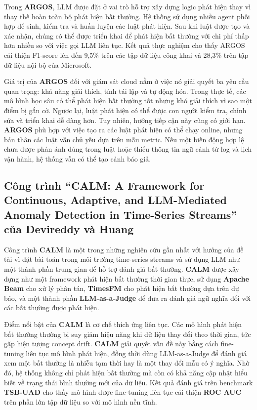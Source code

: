 Trong \textbf{ARGOS}, LLM được đặt ở vai trò hỗ trợ xây dựng logic phát hiện thay vì thay thế hoàn toàn bộ phát hiện bất thường. Hệ thống sử dụng nhiều agent phối hợp để sinh, kiểm tra và huấn luyện các luật phát hiện. Sau khi luật được tạo và xác nhận, chúng có thể được triển khai để phát hiện bất thường với chi phí thấp hơn nhiều so với việc gọi LLM liên tục. Kết quả thực nghiệm cho thấy ARGOS cải thiện F1-score lên đến 9,5\% trên các tập dữ liệu công khai và 28,3\% trên tập dữ liệu nội bộ của Microsoft.

Giá trị của \textbf{ARGOS} đối với giám sát cloud nằm ở việc nó giải quyết ba yêu cầu quan trọng: khả năng giải thích, tính tái lập và tự động hóa. Trong thực tế, các mô hình học sâu có thể phát hiện bất thường tốt nhưng khó giải thích vì sao một điểm bị gắn cờ. Ngược lại, luật phát hiện có thể được con người kiểm tra, chỉnh sửa và triển khai dễ dàng hơn. Tuy nhiên, hướng tiếp cận này cũng có giới hạn. \textbf{ARGOS} phù hợp với việc tạo ra các luật phát hiện có thể chạy online, nhưng bản thân các luật vẫn chủ yếu dựa trên mẫu metric. Nếu một biến động hợp lệ chưa được phản ánh đúng trong luật hoặc thiếu thông tin ngữ cảnh từ log và lịch vận hành, hệ thống vẫn có thể tạo cảnh báo giả.

\subsection*{Công trình “CALM: A Framework for Continuous, Adaptive, and LLM-Mediated Anomaly Detection in Time-Series Streams” của Devireddy và Huang}

Công trình \textbf{CALM} là một trong những nghiên cứu gần nhất với hướng của đề tài vì đặt bài toán trong môi trường time-series streams và sử dụng LLM như một thành phần trung gian để hỗ trợ đánh giá bất thường. \textbf{CALM} được xây dựng như một framework phát hiện bất thường thời gian thực, sử dụng \textbf{Apache Beam} cho xử lý phân tán, \textbf{TimesFM} cho phát hiện bất thường dựa trên dự báo, và một thành phần \textbf{LLM-as-a-Judge} để đưa ra đánh giá ngữ nghĩa đối với các bất thường được phát hiện.

Điểm nổi bật của \textbf{CALM} là cơ chế thích ứng liên tục. Các mô hình phát hiện bất thường thường bị suy giảm hiệu năng khi dữ liệu thay đổi theo thời gian, tức gặp hiện tượng concept drift. \textbf{CALM} giải quyết vấn đề này bằng cách fine-tuning liên tục mô hình phát hiện, đồng thời dùng LLM-as-a-Judge để đánh giá xem một bất thường là nhiễu tạm thời hay là một thay đổi mẫu có ý nghĩa. Nhờ đó, hệ thống không chỉ phát hiện bất thường mà còn có khả năng cập nhật hiểu biết về trạng thái bình thường mới của dữ liệu. Kết quả đánh giá trên benchmark \textbf{TSB-UAD} cho thấy mô hình được fine-tuning liên tục cải thiện \textbf{ROC AUC} trên phần lớn tập dữ liệu so với mô hình nền tĩnh.

